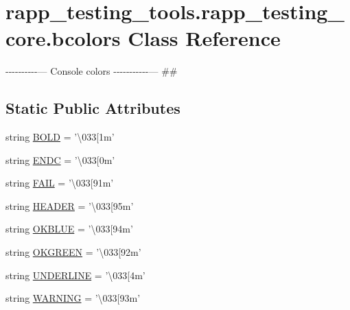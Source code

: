 \hypertarget{classrapp__testing__tools_1_1rapp__testing__core_1_1bcolors}{\section{rapp\-\_\-testing\-\_\-tools.\-rapp\-\_\-testing\-\_\-core.\-bcolors Class Reference}
\label{classrapp__testing__tools_1_1rapp__testing__core_1_1bcolors}
}


-\/-\/-\/-\/-\/-\/-\/-\/-\/-\/--- Console colors -\/-\/-\/-\/-\/-\/-\/-\/-\/-\/-\/--- \#\#  


\subsection*{Static Public Attributes}
\begin{DoxyCompactItemize}
\item 
string \hyperlink{classrapp__testing__tools_1_1rapp__testing__core_1_1bcolors_a780268b94b840ba5fe9e401697f6c0a7}{B\-O\-L\-D} = '\textbackslash{}033\mbox{[}1m'
\item 
string \hyperlink{classrapp__testing__tools_1_1rapp__testing__core_1_1bcolors_aab5d82cfed6414c1a8d9bd71fa02293e}{E\-N\-D\-C} = '\textbackslash{}033\mbox{[}0m'
\item 
string \hyperlink{classrapp__testing__tools_1_1rapp__testing__core_1_1bcolors_a736e78318303a4d6c5a890ace95c53d1}{F\-A\-I\-L} = '\textbackslash{}033\mbox{[}91m'
\item 
string \hyperlink{classrapp__testing__tools_1_1rapp__testing__core_1_1bcolors_af91464ab5d6d8c18702b08dd82149a8b}{H\-E\-A\-D\-E\-R} = '\textbackslash{}033\mbox{[}95m'
\item 
string \hyperlink{classrapp__testing__tools_1_1rapp__testing__core_1_1bcolors_a9c4c365e1b612bfa66f1f67920a97096}{O\-K\-B\-L\-U\-E} = '\textbackslash{}033\mbox{[}94m'
\item 
string \hyperlink{classrapp__testing__tools_1_1rapp__testing__core_1_1bcolors_aaaff3ce6720a04ce7f73c66fce6eaff9}{O\-K\-G\-R\-E\-E\-N} = '\textbackslash{}033\mbox{[}92m'
\item 
string \hyperlink{classrapp__testing__tools_1_1rapp__testing__core_1_1bcolors_aee1dec3a4635461ff95db736fe105149}{U\-N\-D\-E\-R\-L\-I\-N\-E} = '\textbackslash{}033\mbox{[}4m'
\item 
string \hyperlink{classrapp__testing__tools_1_1rapp__testing__core_1_1bcolors_a38d3b531ddaa4c1a23d0482ce019e9ec}{W\-A\-R\-N\-I\-N\-G} = '\textbackslash{}033\mbox{[}93m'
\end{DoxyCompactItemize}


